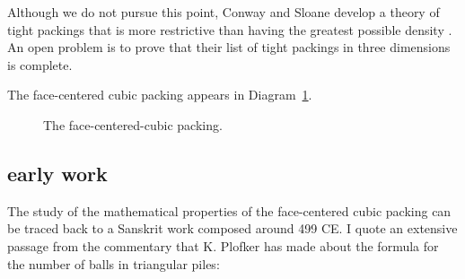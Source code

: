 Although we do not pursue this point, Conway and Sloane develop
a theory of tight packings that is more restrictive than having the
greatest possible density \cite{CoSl95}.
An open problem is to prove that their
list of tight packings in three dimensions is complete.

The face-centered cubic packing appears in
Diagram~\ref{fig:fcc-pack}.

\begin{figure}[htb]
  \centering
  \caption{The face-centered-cubic packing.}
  \label{fig:fcc-pack}
\end{figure}


\subsection{early work}
\label{sec:early}

The study of the mathematical properties of the face-centered cubic
packing can be traced back to a Sanskrit work composed around 499 CE.
I quote an extensive passage from the commentary that K. Plofker
has made about the formula
for the number of balls in triangular piles\cite{Plo00}:
\medskip

